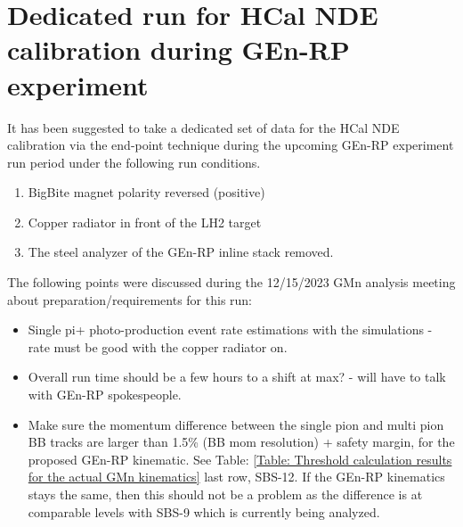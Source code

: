 \section{Dedicated run for HCal NDE calibration during GEn-RP experiment}

It has been suggested to take a dedicated set of data for the HCal NDE calibration via the end-point technique during the upcoming GEn-RP experiment run period under the following run conditions.

\begin{enumerate}
    \item BigBite magnet polarity reversed (positive) 
    \item Copper radiator in front of the LH2 target
    \item The steel analyzer of the GEn-RP inline stack removed.
\end{enumerate}


The following points were discussed during the 12/15/2023 GMn analysis meeting about preparation/requirements for this run:

\begin{itemize}
    \item Single pi+ photo-production event rate estimations with the simulations - rate must be good with the copper radiator on.
    \item Overall run time should be a few hours to a shift at max? - will have to talk with GEn-RP spokespeople.
    \item Make sure the momentum difference between the single pion and multi pion BB tracks are larger than 1.5\% (BB mom resolution) + safety margin, for the proposed GEn-RP kinematic. See Table: \ref{Table: Threshold calculation results for the actual GMn kinematics} last row, SBS-12. If the GEn-RP kinematics stays the same, then this should not be a problem as the difference is at comparable levels with SBS-9 which is currently being analyzed.
\end{itemize}